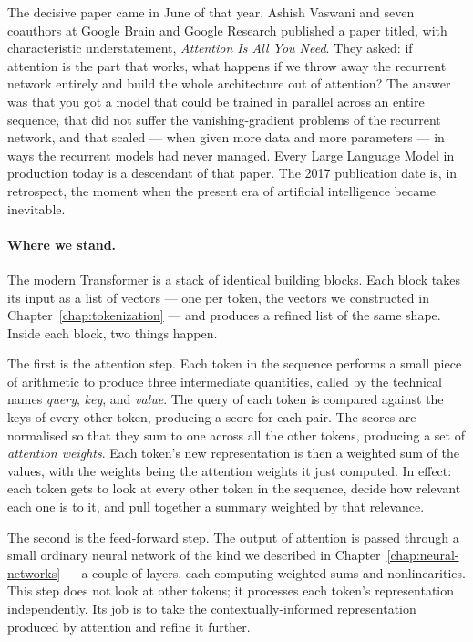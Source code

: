 The decisive paper came in June of that year. Ashish Vaswani
and seven coauthors at Google Brain and Google Research
published a paper titled, with characteristic understatement,
\emph{Attention Is All You Need}. They asked: if attention is
the part that works, what happens if we throw away the recurrent
network entirely and build the whole architecture out of
attention? The answer was that you got a model that could be
trained in parallel across an entire sequence, that did not
suffer the vanishing-gradient problems of the recurrent
network, and that scaled --- when given more data and more
parameters --- in ways the recurrent models had never managed.
Every Large Language Model in production today is a descendant
of that paper. The 2017 publication date is, in retrospect, the
moment when the present era of artificial intelligence became
inevitable.

\paragraph{Where we stand.} The modern Transformer is a stack of identical building blocks.
Each block takes its input as a list of vectors --- one per
token, the vectors we constructed in Chapter~\ref{chap:tokenization} --- and produces
a refined list of the same shape. Inside each block, two things
happen.

The first is the attention step. Each token in the sequence
performs a small piece of arithmetic to produce three intermediate
quantities, called by the technical names \emph{query},
\emph{key}, and \emph{value}. The query of each token is
compared against the keys of every other token, producing a
score for each pair. The scores are normalised so that they sum
to one across all the other tokens, producing a set of
\emph{attention weights}. Each token's new representation is
then a weighted sum of the values, with the weights being the
attention weights it just computed. In effect: each token gets to
look at every other token in the sequence, decide how relevant
each one is to it, and pull together a summary weighted by that
relevance.

The second is the feed-forward step. The output of attention is
passed through a small ordinary neural network of the kind we
described in Chapter~\ref{chap:neural-networks} --- a couple of layers, each computing
weighted sums and nonlinearities. This step does not look at
other tokens; it processes each token's representation
independently. Its job is to take the contextually-informed
representation produced by attention and refine it further.

